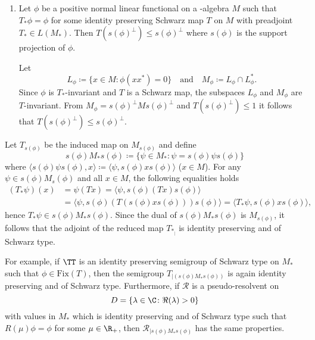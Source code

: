 \begin{enumerate}[1., wide, labelsep=1em, itemindent=\parindent]
\item
Let $ \phi $ be a positive normal linear functional on a \WA-algebra $ M $ such that $ T_{*}\phi = \phi $ for some identity preserving Schwarz map $ T $ on $ M $ with preadjoint $ T_{*} \in L(M_{*}) $.
Then $ T(s(\phi)^{\perp}) \leq s(\phi)^{\perp} $ where $ s(\phi) $ is the support projection of $ \phi $.

Let 
%
\[
	L_\phi \coloneqq \{ x \in M \colon \phi(xx^{*}) = 0 \}
	\quad \text{and} \quad
	M_\phi \coloneqq L_\phi \cap L_\phi^{*} .
\]
%
Since $ \phi $ is $ T_{*} $-invariant and $ T $ is a Schwarz map, the subspaces $ L_{\phi} $ and $ M_{\phi} $ are $ T $-invariant.
From $ M_{\phi} = s(\phi)^{\perp}Ms(\phi)^{\perp} $ and $ T(s(\phi)^{\perp}) \leq 1 $ it follows that $ T(s(\phi)^{\perp}) \leq s(\phi)^{\perp} $.

\end{enumerate}
Let $ T_{s(\phi)} $ be the induced map on $ M_{s(\phi)} $ and define
\[
	s(\phi)M_{*}s(\phi) \coloneqq \{\psi \in M_{*} \colon \psi = s(\phi)\psi s(\phi)\}
\]
where $ \langle s(\phi)\psi s(\phi),x \rangle \coloneqq \langle \psi,s(\phi)xs(\phi) \rangle $ ($ x \in M $).
For any $\psi \in s(\phi)M_s(\phi)$ and all $x \in M$, the following equalities holds
\begin{align*}
(T_{*}\psi)(x) &= \psi(Tx) = \langle \psi,s(\phi)(Tx)s(\phi) \rangle \\
	&= \langle \psi,s(\phi)(T(s(\phi)xs(\phi)))s(\phi) \rangle = \langle T_{*}\psi,s(\phi)xs(\phi) \rangle,
\end{align*}
hence $ T_{*}\psi \in s(\phi)M_{*}s(\phi) $.
Since the dual of $ s(\phi)M_{*}s(\phi) $ is $ M_{s(\phi)} $, it follows that the adjoint of the reduced map $ T_{*_{|}} $ is identity preserving and of Schwarz type.

For example, if $ \TT $ is an identity preserving semigroup of Schwarz type on $ M_{*} $ such that $ \phi \in \text{Fix}(T) $, then the semigroup $ T_{\vert (s(\phi)M_{*}s(\phi))} $ is again identity preserving and of Schwarz type.
Furthermore, if  $ \mathcal{R} $ is a pseudo-resolvent on 
%
\[
	D = \{\lambda \in \C \colon \Re(\lambda) > 0\} 
\]
%
with values in $ M_{*} $ which is identity preserving and of Schwarz type such that $ R(\mu)\phi = \phi $ for some $ \mu \in \R_{+} $, then $ \mathcal{R}_{\vert s(\phi)M_{*}s(\phi)} $ has the same properties.


%
% 

